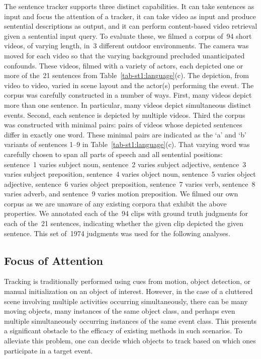 The sentence tracker supports three distinct capabilities.
%
It can take sentences as input and focus the attention of a tracker, it can
take video as input and produce sentential descriptions as output, and it can
perform content-based video retrieval given a sentential input query.
%
To evaluate these, we filmed a corpus of~94 short videos, of varying
length, in~3 different outdoor environments.
%
The camera was moved for each video so that the varying background
precluded unanticipated confounds.
%
These videos, filmed with a variety of actors, each depicted one or more of
the~21 sentences from Table~\ref{tab-st1:language}(c).
%
The depiction, from video to video, varied in scene layout and the actor(s)
performing the event.
%
The corpus was carefully constructed in a number of ways.
%
First, many videos depict more than one sentence.
%
In particular, many videos depict simultaneous distinct events.
%
Second, each sentence is depicted by multiple videos.
%
Third the corpus was constructed with minimal pairs: pairs of videos whose
depicted sentences differ in exactly one word.
%
These minimal pairs are indicated as the `a' and `b' variants of sentences 1--9
in Table~\ref{tab-st1:language}(c).
%
That varying word was carefully chosen to span all parts of speech and all
sentential positions: sentence~1 varies subject noun, sentence~2 varies subject
adjective, sentence~3 varies subject preposition, sentence~4 varies object
noun, sentence~5 varies object adjective, sentence~6 varies object preposition,
sentence~7 varies verb, sentence~8 varies adverb, and sentence~9 varies
motion preposition.
%
We filmed our own corpus as we are unaware of any existing corpora that exhibit
the above properties.
%
We annotated each of the~94 clips with ground truth judgments for each of
the~21 sentences, indicating whether the given clip depicted the given
sentence.
%
This set of~1974 judgments was used for the following analyses.

\subsection{Focus of Attention}
\label{subsec:foa}
%
Tracking is traditionally performed using cues from motion, object detection,
or manual initialization on an object of interest.
%
However, in the case of a cluttered scene involving multiple activities
occurring simultaneously, there can be many moving objects, many instances of
the same object class, and perhaps even multiple simultaneously occurring
instances of the same event class.
%
This presents a significant obstacle to the efficacy of existing methods in
such scenarios.
%
To alleviate this problem, one can decide which objects to track based on which
ones participate in a target event.

